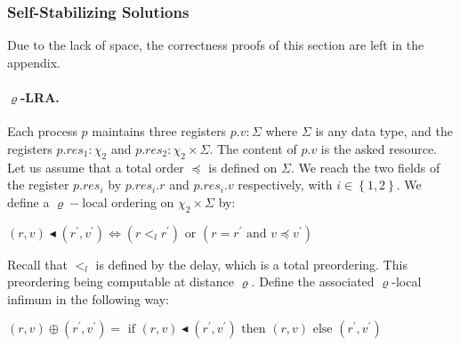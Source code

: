 \documentclass[11pt]{article}
\newcommand{\text}[1]{\mbox{#1}}
\begin{document}
\subsubsection{Self-Stabilizing Solutions}
\label{sub:SSLRA}

Due to the lack of space, the correctness proofs of this section are left in the appendix.

\paragraph{$\varrho$-LRA.}

Each process $p$ maintains three registers $p.v:\Sigma $ where $\Sigma $ is
any data type, and the registers $p.res_{1}:\chi _{2}$ and $p.res_{2}:\chi _{2}\times \Sigma $. The
content of $p.v$ is the asked resource. Let us assume that a total order $
\preceq $ is defined on $\Sigma $. 
We reach the two fields of the register $p.res_{i}$ by $p.res_{i}.r$ and $p.res_{i}.v$ respectively, with $i\in \left\{ 1,2\right\} $.  
We define a $\varrho -$local ordering on $\chi _{2}\times \Sigma $ by:
\begin{center}
$
\left( r,v\right) \blacktriangleleft (r^{\prime },v^{\prime
})\Leftrightarrow  (r<_{l}r^{\prime })  \text{ or } (r=r^{\prime }\text{ and }v\preceq v^{\prime })
$
\end{center}
Recall that $<_{l}$ is defined by the delay, which is a total preordering. This preordering being computable at distance $\varrho$.    
Define the associated $\varrho$-local infimum in the following way:
\begin{center}$
\left( r,v\right) \oplus (r^{\prime },v^{\prime })= \text{ if } \left( r,v\right) 
\blacktriangleleft (r^{\prime},v^{\prime }) \text{ then } \left( r,v\right) \text{ else } (r^{\prime },v^{\prime })
$
\end{center}
\end{document}

